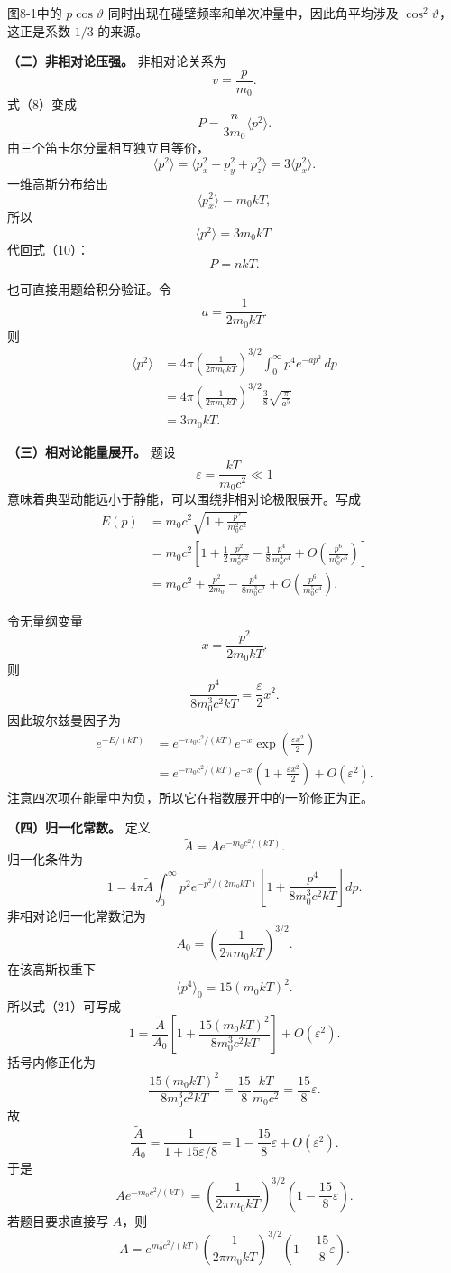 \documentclass[12pt,a4paper,UTF8]{ctexart}
\begin{document}
图8-1中的 \(p\cos\vartheta\)
同时出现在碰壁频率和单次冲量中，因此角平均涉及
\(\cos^2\vartheta\)，这正是系数 \(1/3\) 的来源。

\textbf{（二）非相对论压强。} 非相对论关系为 \[
v=\frac p{m_0}. \tag{9}
\] 式（8）变成 \[
P=\frac n{3m_0}\langle p^2\rangle. \tag{10}
\] 由三个笛卡尔分量相互独立且等价， \[
\langle p^2\rangle
=\langle p_x^2+p_y^2+p_z^2\rangle
=3\langle p_x^2\rangle. \tag{11}
\] 一维高斯分布给出 \[
\langle p_x^2\rangle=m_0kT, \tag{12}
\] 所以 \[
\langle p^2\rangle=3m_0kT. \tag{13}
\] 代回式（10）： \[
\boxed{P=nkT}. \tag{14}
\]

也可直接用题给积分验证。令 \[
a=\frac1{2m_0kT}.
\] 则 \[
\begin{aligned}
\langle p^2\rangle
&=4\pi
\left(\frac1{2\pi m_0kT}\right)^{3/2}
\int_0^\infty p^4e^{-ap^2}\,dp\\
&=4\pi
\left(\frac1{2\pi m_0kT}\right)^{3/2}
\frac38\sqrt{\frac\pi{a^5}}\\
&=3m_0kT.
\end{aligned} \tag{15}
\]

\textbf{（三）相对论能量展开。} 题设 \[
\varepsilon=\frac{kT}{m_0c^2}\ll1
\] 意味着典型动能远小于静能，可以围绕非相对论极限展开。写成 \[
\begin{aligned}
E(p)
&=m_0c^2\sqrt{1+\frac{p^2}{m_0^2c^2}}\\
&=m_0c^2\left[
1+\frac12\frac{p^2}{m_0^2c^2}
-\frac18\frac{p^4}{m_0^4c^4}
+O\left(\frac{p^6}{m_0^6c^6}\right)
\right]\\
&=m_0c^2+\frac{p^2}{2m_0}
-\frac{p^4}{8m_0^3c^2}
+O\left(\frac{p^6}{m_0^5c^4}\right).
\end{aligned} \tag{16}
\]

令无量纲变量 \[
x=\frac{p^2}{2m_0kT}. \tag{17}
\] 则 \[
\frac{p^4}{8m_0^3c^2kT}
=\frac{\varepsilon}{2}x^2. \tag{18}
\] 因此玻尔兹曼因子为 \[
\begin{aligned}
e^{-E/(kT)}
&=e^{-m_0c^2/(kT)}
e^{-x}
\exp\left(\frac{\varepsilon x^2}{2}\right)\\
&=e^{-m_0c^2/(kT)}
e^{-x}
\left(1+\frac{\varepsilon x^2}{2}\right)
+O(\varepsilon^2).
\end{aligned} \tag{19}
\] 注意四次项在能量中为负，所以它在指数展开中的一阶修正为正。

\textbf{（四）归一化常数。} 定义 \[
\widetilde A
=Ae^{-m_0c^2/(kT)}. \tag{20}
\] 归一化条件为 \[
1=4\pi\widetilde A
\int_0^\infty
p^2e^{-p^2/(2m_0kT)}
\left[
1+\frac{p^4}{8m_0^3c^2kT}
\right]dp. \tag{21}
\] 非相对论归一化常数记为 \[
A_0=\left(\frac1{2\pi m_0kT}\right)^{3/2}. \tag{22}
\] 在该高斯权重下 \[
\langle p^4\rangle_0
=15(m_0kT)^2. \tag{23}
\] 所以式（21）可写成 \[
1=\frac{\widetilde A}{A_0}
\left[
1+\frac{15(m_0kT)^2}
{8m_0^3c^2kT}
\right]
+O(\varepsilon^2). \tag{24}
\] 括号内修正化为 \[
\frac{15(m_0kT)^2}
{8m_0^3c^2kT}
=\frac{15}{8}\frac{kT}{m_0c^2}
=\frac{15}{8}\varepsilon. \tag{25}
\] 故 \[
\frac{\widetilde A}{A_0}
=\frac1{1+15\varepsilon/8}
=1-\frac{15}{8}\varepsilon
+O(\varepsilon^2). \tag{26}
\] 于是 \[
\boxed{
Ae^{-m_0c^2/(kT)}
=\left(\frac1{2\pi m_0kT}\right)^{3/2}
\left(1-\frac{15}{8}\varepsilon\right)
}. \tag{27}
\] 若题目要求直接写 \(A\)，则 \[
\boxed{
A=e^{m_0c^2/(kT)}
\left(\frac1{2\pi m_0kT}\right)^{3/2}
\left(1-\frac{15}{8}\varepsilon\right)
}. \tag{28}
\]
\end{document}

